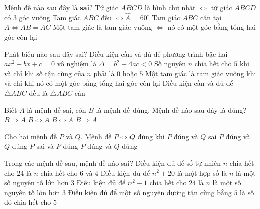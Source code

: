 \begin{ex}%
	Mệnh đề nào sau đây là  \textbf{sai}?
	 \choice
		{Tứ  giác $ABCD$ là hình chữ nhật $\Leftrightarrow $ tứ giác $ABCD$ có 3 góc vuông}
		{\True Tam giác $ABC$ đều $\Leftrightarrow \widehat{A}=60^\circ$} 
		{Tam giác $ABC$ cân tại $A\Leftrightarrow AB=AC$} 
		{Một tam giác là tam giác vuông $\Leftrightarrow$ nó có một góc bằng  tổng hai góc còn lại}
\end{ex}

\begin{ex}%
	Phát biểu nào sau đây sai? 
	\choice 
		{Điều kiện cần và đủ để phương trình bậc  hai $a x^{2}+b x+c=0$ vô nghiệm là $\Delta=b^{2}-4 a c<0$}
		{Số nguyên $n$ chia hết cho $5$ khi và chỉ khi số  tận cùng của $n$ phải là $0$ hoặc $5$}
		{Một tam giác là tam  giác vuông khi và chỉ khi nó có một góc bằng tổng hai góc còn lại}
		{\True  Điều kiện cần và đủ để $\triangle ABC$ đều là $\triangle ABC$ cân}
\end{ex}

\begin{ex}%
	Biết $A$ là  mệnh đề sai, còn $B$ là mệnh đề đúng. Mệnh đề nào sau đây là đúng?
	 \choice
		{$B\Rightarrow A$} 
		{$B\Leftrightarrow  A$}
		 {$\overline{B}\Leftrightarrow\overline{A}$}
		{\True  $B\Rightarrow\overline{A}$}
\end{ex}

\begin{ex}%
	Cho hai mệnh đề $P$ và $Q$. Mệnh đề $P\Leftrightarrow Q$ đúng  khi
	\choice 
		{$P$  đúng và $Q$ sai}
		{$\overline{P}$ đúng  và $Q$ đúng}
		{$P$ sai  và $P$ đúng}
		{\True $\overline{P}$  đúng và $\overline{Q}$ đúng}
\end{ex}

\begin{ex}%
	Trong các mệnh đề sau,  mệnh đề nào sai?
	\choice 
		{\True Điều kiện đủ để số tự nhiên $n$ chia  hết cho $24$ là $n$ chia hết cho $6$ và $4$}
		{Điều kiện đủ để $n^2+20$ là một hợp số  là $n$ là một số nguyên tố lớn hơn $3$}
		{Điều kiện đủ để $n^2-1$ chia hết cho $24$ là  $n$ là một số nguyên tố lớn hơn $3$}
		{Điều kiện đủ để một số nguyên dương tận cùng bằng $5$ là  số đó chia hết cho $5$}
\end{ex}

